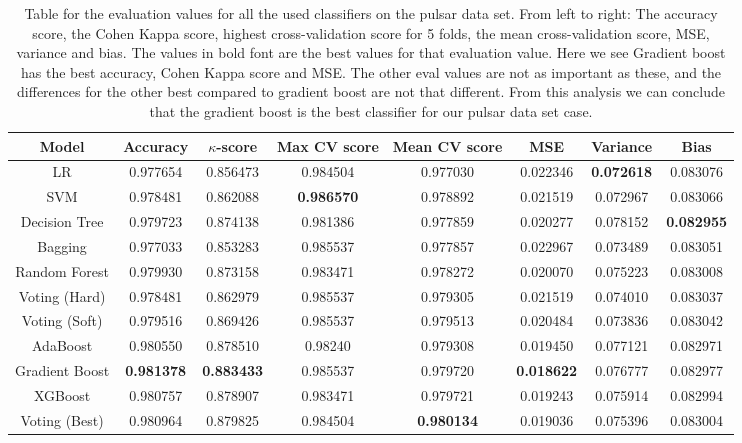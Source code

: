 \documentclass[12pt,a4paper,english]{article}
\begin{document}
\begin{table}[htbp!]
	\hspace{-1.5cm}
	\begin{tabular}{ |c|c|c|c|c|c|c|c| }
		\hline \rule{0pt}{13pt}
		Model & Accuracy & $\kappa$-score & Max CV score & Mean CV score & MSE & Variance & Bias \\
		\hline \rule{0pt}{13pt}
		LR & 0.977654 & 0.856473 & 0.984504 & 0.977030 & 0.022346 & \textbf{0.072618} & 0.083076 \\
		\hline \rule{0pt}{13pt}
		SVM & 0.978481 & 0.862088 & \textbf{0.986570} & 0.978892 & 0.021519 & 0.072967 & 0.083066 \\
		\hline \rule{0pt}{13pt}
		Decision Tree & 0.979723 & 0.874138 & 0.981386 & 0.977859 & 0.020277 & 0.078152 & \textbf{0.082955} \\
		\hline \rule{0pt}{13pt}
		Bagging & 0.977033 & 0.853283 & 0.985537 & 0.977857 & 0.022967 & 0.073489 & 0.083051 \\
		\hline \rule{0pt}{13pt}
		Random Forest & 0.979930 & 0.873158 & 0.983471 & 0.978272 & 0.020070 & 0.075223 & 0.083008 \\
		\hline \rule{0pt}{13pt}
		Voting (Hard) & 0.978481 & 0.862979 & 0.985537 & 0.979305 & 0.021519 & 0.074010 & 0.083037 \\
		\hline \rule{0pt}{13pt}
		Voting (Soft) & 0.979516 & 0.869426 & 0.985537 & 0.979513 & 0.020484 & 0.073836 & 0.083042 \\
		\hline \rule{0pt}{13pt}
		AdaBoost & 0.980550 & 0.878510 & 0.98240 & 0.979308 & 0.019450 & 0.077121 & 0.082971 \\
		\hline \rule{0pt}{13pt}
		Gradient Boost & \textbf{0.981378} & \textbf{0.883433} & 0.985537 & 0.979720 & \textbf{0.018622} & 0.076777 & 0.082977 \\
		\hline \rule{0pt}{13pt}
		XGBoost & 0.980757 & 0.878907 & 0.983471 & 0.979721 & 0.019243 & 0.075914 & 0.082994 \\
		\hline \rule{0pt}{13pt}
		Voting (Best) & 0.980964 & 0.879825 & 0.984504 & \textbf{0.980134} & 0.019036 & 0.075396 & 0.083004 \\
		\hline
	\end{tabular}	
	\caption{Table for the evaluation values for all the used classifiers on the pulsar data set. From left to right: The accuracy score, the Cohen Kappa score, highest cross-validation score for 5 folds, the mean cross-validation score, MSE, variance and bias. The values in bold font are the best values for that evaluation value. Here we see Gradient boost has the best accuracy, Cohen Kappa score and MSE. The other eval values are not as important as these, and the differences for the other best compared to gradient boost are not that different. From this analysis we can conclude that the gradient boost is the best classifier for our pulsar data set case. \label{tab:classifiers}}
\end{table}
\end{document}
